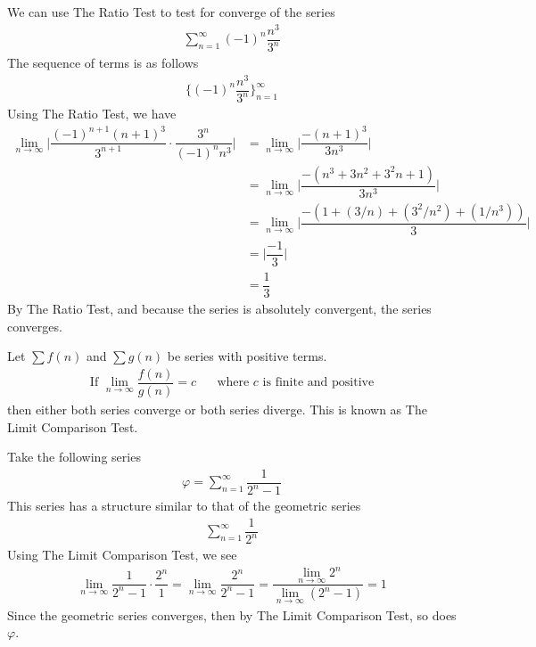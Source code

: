 \begin{example}
We can use The Ratio Test to test for converge of the series
\begin{align*}
    \sum_{n = 1}^{\infty} (-1)^{n} \dfrac{n^{3}}{3^{n}}
\end{align*}
The sequence of terms is as follows
\begin{align*}
    \Big\{(-1)^{n} \dfrac{n^{3}}{3^{n}}\Big\}_{n = 1}^{\infty}
\end{align*}
Using The Ratio Test, we have
\begin{align*}
    \lim_{n \longrightarrow \infty} \Big\lvert \dfrac{(-1)^{n+1}(n+1)^{3}}{3^{n+1}} \cdot \dfrac{3^{n}}{(-1)^{n}n^{3}} \Big\rvert &= \lim_{n \longrightarrow \infty} \Big\lvert \dfrac{-(n+1)^{3}}{3n^{3}} \Big\rvert\\[2ex]
    &= \lim_{n \longrightarrow \infty} \Big\lvert \dfrac{-(n^{3} + 3n^{2} + 3^{2}n + 1)}{3n^{3}} \Big\rvert\\[2ex]
    &= \lim_{n \longrightarrow \infty} \Big\lvert \dfrac{-(1 + (3/n) + (3^{2}/n^{2}) + (1/n^{3}))}{3} \Big\rvert\\[2ex]
    &= \Big\lvert \dfrac{-1}{3} \Big\rvert\\[2ex]
    &= \dfrac{1}{3}
\end{align*}
By The Ratio Test, and because the series is absolutely convergent, the series converges. 
\end{example}

\begin{theorem}
Let $\sum f(n)$ and $\sum g(n)$ be series with positive terms. 
\begin{align*}
    \text{If} \hspace{4pt} \lim_{n \longrightarrow \infty} \dfrac{f(n)}{g(n)} = c \hspace{20pt} \text{where} \hspace{4pt} c \hspace{4pt} \text{is finite and positive} 
\end{align*}
then either both series converge or both series diverge. This is known as The Limit Comparison Test.
\end{theorem}

\begin{example}
Take the following series
\begin{align*}
    \varphi = \sum_{n = 1}^{\infty} \dfrac{1}{2^{n} - 1}
\end{align*}
This series has a structure similar to that of the geometric series
\begin{align*}
    \sum_{n = 1}^{\infty} \dfrac{1}{2^{n}}
\end{align*}
Using The Limit Comparison Test, we see
\begin{align*}
    \lim_{n \longrightarrow \infty} \dfrac{1}{2^{n} - 1} \cdot \dfrac{2^{n}}{1} = \lim_{n \longrightarrow \infty} \dfrac{2^{n}}{2^{n} - 1} = \dfrac{\lim_{n \longrightarrow \infty} 2^{n}}{\lim_{n \longrightarrow \infty} (2^{n} - 1)} = 1
\end{align*}
Since the geometric series converges, then by The Limit Comparison Test, so does $\varphi$.
\end{example}

